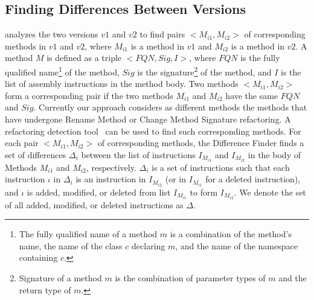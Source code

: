\subsection{Finding Differences Between Versions}
 analyzes the two versions $v1$ and $v2$ to find pairs $<$$M_{i1}, M_{i2}$$>$ of corresponding methods in $v1$ and $v2$, where $M_{i1}$ is a method in $v1$ and $M_{i2}$ is a method in $v2$. A method $M$ is defined as a triple $<$$FQN, Sig, I$$>$, where $FQN$ is the fully qualified name\footnote{\scriptsize{The fully qualified name of a method $m$ is a combination of the method's name, the name of the class $c$ declaring $m$, and the name of the namespace containing $c$.}} of the method, $Sig$ is the signature\footnote{\scriptsize{Signature of a method $m$ is the combination of parameter types of $m$ and the return type of $m$.}} of the method, and $I$ is the list of assembly instructions in the method body. Two methods $<$$M_{i1}, M_{i2}$$>$ form a  corresponding pair if the two methods $M_{i1}$ and $M_{i2}$ have the same $FQN$ and $Sig$. Currently our approach considers as different methods the methods that have undergone Rename Method or Change Method Signature refactoring. A refactoring detection tool~\cite{Dig'06:ECOOP} can be used to find such corresponding methods. For each pair $<$$M_{i1}, M_{i2}$$>$ of corresponding methods, the Difference Finder finds a set of  differences $\Delta_i$ between the list of instructions $I_{M_{i1}}$ and $I_{M_{i2}}$ in the body of Methods $M_{i1}$ and $M_{i2}$, respectively. $\Delta_i$ is a set of instructions such that each instruction $\iota$ in $\Delta_i$ is an instruction in $I_{M_{i2}}$ (or in $I_{M_{i1}}$ for a deleted instruction), and $\iota$ is added, modified, or deleted from list $I_{M_{i1}}$ to form $I_{M_{i2}}$. 
We denote the set of all added, modified, or deleted instructions as $\Delta$. 
%   
